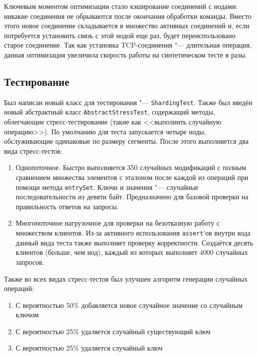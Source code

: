 \documentclass[a4paper]{article}
\renewcommand{\t}{\texttt}
\begin{document}
  Ключевым моментом оптимизации стало кэширование соединений с нодами: никакие соединения не обрываются
  после окончания обработки команды. Вместо этого новое соединение складывается в множество активных соединений
  и, если потребуется установить связь с этой нодой еще раз, будет переиспользовано старое соединение.
  Так как установка TCP-соединения "--- длительная операция, данная оптимизация увеличила скорость работы
  на синтетическом тесте в разы.

\label{sharding_test}
\subsection{Тестирование}
  Был написан новый класс для тестирования "--- \t{ShardingTest}. Также был введён новый абстрактный класс
  \t{AbstractStressTest}, содержащий методы, облегчающие стресс-тестирование (такие как <<выполнить случайную
  операцию>>). По умолчанию для теста запускается четыре ноды, обслуживающие одинаковые по размеру сегменты.
  После этого выполняется два вида стресс-тестов:
  
  \begin{enumerate}
  \item Однопоточное. Быстро выполняется 350 случайных модификаций с полным сравнением множества
        элементов с эталоном после каждой из операций при помощи метода \t{entrySet}. Ключи и
        значения "--- случайные последовательности из девяти байт. Предназначено для базовой
        проверки на правильность ответов на запросы.
  \item Многопоточное нагрузочное для проверки на безотказную работу с множеством клиентов.
        Из-за активного использования \t{assert}'ов внутри кода данный вида теста также
        выполняет проверку корректности. Создаётся десять клиентов (больше, чем нод),
        каждый из которых выполняет $4000$ случайных запросов.
  \end{enumerate}

  Также во всех видах стресс-тестов был улучшен алгоритм генерации случайных операций:
  \begin{enumerate}
  \item С вероятностью 50\% добавляется новое случайное значение со случайным ключом
  \item С вероятностью 25\% удаляется случайный существующий ключ
  \item С вероятностью 25\% удаляется случайный ключ
  \end{enumerate}
\end{document}
